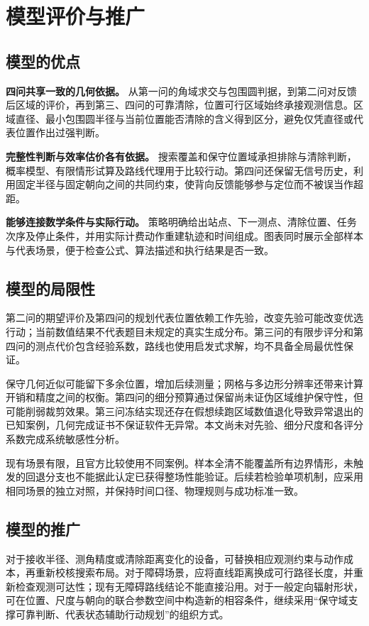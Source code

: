\documentclass[UTF8,a4paper,zihao=-4,fontset=none]{ctexart}
\begin{document}
\section{模型评价与推广}

\subsection{模型的优点}

\textbf{四问共享一致的几何依据。} 从第一问的角域求交与包围圆判据，到第二问对反馈后区域的评价，再到第三、四问的可靠清除，位置可行区域始终承接观测信息。区域直径、最小包围圆半径与当前位置能否清除的含义得到区分，避免仅凭直径或代表位置作出过强判断。

\textbf{完整性判断与效率估价各有依据。} 搜索覆盖和保守位置域承担排除与清除判断，概率模型、有限情形试算及路线代理用于比较行动。第四问还保留无信号历史，利用固定半径与固定朝向之间的共同约束，使背向反馈能够参与定位而不被误当作超距。

\textbf{能够连接数学条件与实际行动。} 策略明确给出站点、下一测点、清除位置、任务次序及停止条件，并用实际计费动作重建轨迹和时间组成。图表同时展示全部样本与代表场景，便于检查公式、算法描述和执行结果是否一致。

\subsection{模型的局限性}

第二问的期望评价及第四问的规划代表位置依赖工作先验，改变先验可能改变优选行动；当前数值结果不代表题目未规定的真实生成分布。第三问的有限步评分和第四问的测点代价包含经验系数，路线也使用启发式求解，均不具备全局最优性保证。

保守几何近似可能留下多余位置，增加后续测量；网格与多边形分辨率还带来计算开销和精度之间的权衡。第四问的细分预算通过保留尚未证伪区域维护保守性，但可能削弱裁剪效果。第三问冻结实现还存在假想续跑区域数值退化导致异常退出的已知案例，几何完成证书不保证软件无异常。本文尚未对先验、细分尺度和各评分系数完成系统敏感性分析。

现有场景有限，且官方比较使用不同案例。样本全清不能覆盖所有边界情形，未触发的回退分支也不能据此认定已获得整场性能验证。后续若检验单项机制，应采用相同场景的独立对照，并保持时间口径、物理规则与成功标准一致。

\subsection{模型的推广}

对于接收半径、测角精度或清除距离变化的设备，可替换相应观测约束与动作成本，再重新校核搜索布局。对于障碍场景，应将直线距离换成可行路径长度，并重新检查观测可达性；现有无障碍路线结论不能直接沿用。对于一般定向辐射形状，可在位置、尺度与朝向的联合参数空间中构造新的相容条件，继续采用“保守域支撑可靠判断、代表状态辅助行动规划”的组织方式。
\end{document}
